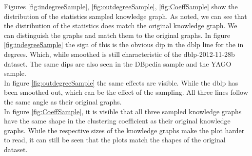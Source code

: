 \documentclass[11pt,letterpaper ,oneside ]{book}
\begin{document}
	\begin{figure}[!b]
		\centering
		
	\end{figure}
	Figures \ref{fig:indegreeSample},  \ref{fig:outdegreeSample},  \ref{fig:CoeffSample} show the distribution of the statistics sampled knowledge graph. As noted, we can see that the distribution of the statistics does match the original knowledge graph. We can distinguish the graphs and match them to the original graphs. 
	In figure \ref{fig:indegreeSample} the sign of this is the obvious dip in the dblp line for the in degrees. Which, while smoothed is still characteristic of the dblp-2012-11-28b dataset. The same dips are also seen in the DBpedia sample and the YAGO sample.\\
	In figure \ref{fig:outdegreeSample} the same effects are visible. While the dblp has been smoothed out, which can be the effect of the sampling. All three lines follow the same angle as their original graphs.\\
	In figure \ref{fig:CoeffSample}, it is visible that all three sampled knowledge graphs have the same shape in the clustering coefficient as their original knowledge graphs. While the respective sizes of the knowledge graphs make the plot harder to read, it can still be seen that the plots match the shapes of the original dataset.
	
\end{document}
